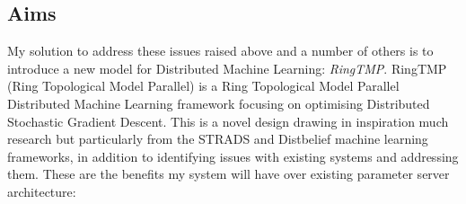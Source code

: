 \subsection{Aims}
My solution to address these issues raised above and a number of others is to
introduce a new model for Distributed Machine Learning: \textit{RingTMP}.
RingTMP (Ring Topological Model Parallel) is a Ring Topological Model Parallel
Distributed Machine Learning framework focusing on optimising Distributed
Stochastic Gradient Descent. This is a novel design drawing in inspiration much
research but particularly from the STRADS and Distbelief machine learning
frameworks, \cite{kim2016STRADS,Dean2012Distbelief} in addition to identifying
issues with existing systems and addressing them. These are the benefits my
system will have over existing parameter server architecture:
\begin{itemize}


\end{itemize}
